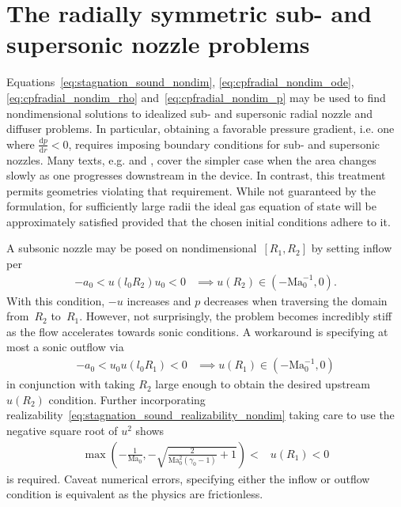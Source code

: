 \documentclass[letterpaper,11pt,nointlimits,reqno]{amsart}
\newcommand{\Mach}[1][]{\mbox{Ma}_{#1}}
\begin{document}
\section{The radially symmetric sub- and supersonic nozzle problems}

Equations~\eqref{eq:stagnation_sound_nondim}, \eqref{eq:cpfradial_nondim_ode},
\eqref{eq:cpfradial_nondim_rho} and~\eqref{eq:cpfradial_nondim_p} may be used
to find nondimensional solutions to idealized sub- and supersonic radial nozzle
and diffuser problems.  In particular, obtaining a favorable pressure gradient,
i.e. one where $\frac{\mathrm{d}p}{\mathrm{d}r} < 0$, requires imposing
boundary conditions for sub- and supersonic nozzles.  Many texts, e.g.
\citet[\textsection{}9.4]{White1999Fluid} and
\citet[\textsection{}97]{Landau2004Fluid}, cover the simpler case when the area
changes slowly as one progresses downstream in the device.  In contrast, this
treatment permits geometries violating that requirement.  While not guaranteed
by the formulation, for sufficiently large radii the ideal gas equation of
state will be approximately satisfied provided that the chosen initial
conditions adhere to it.

A subsonic nozzle may be posed on nondimensional~$\left[R_{1}, R_{2}\right]$ by
setting inflow per
\begin{align}
    -a_0 < u\!\left(l_0 R_{2}\right) u_0 < 0
    &\implies
    u\!\left(R_{2}\right) \in \left(-\Mach[0]^{-1}, 0\right)
.
\end{align}
With this condition, $-u$ increases and $p$ decreases when traversing the
domain from~$R_{2}$ to~$R_{1}$.  However, not surprisingly, the problem becomes
incredibly stiff as the flow accelerates towards sonic conditions.  A
workaround is specifying at most a sonic outflow via
\begin{align}
    -a_0 < u_0 u\!\left(l_0 R_1\right) < 0
    &\implies
    u\!\left(R_1\right) \in \left(-\Mach[0]^{-1}, 0\right)
\end{align}
in conjunction with taking $R_{2}$ large enough to obtain the desired upstream
$u\!\left(R_{2}\right)$ condition.  Further incorporating
realizability~\eqref{eq:stagnation_sound_realizability_nondim} taking care to
use the negative square root of $u^2$ shows
\begin{align}
  \max\left(
    -\frac{1}{\Mach[0]}, -\sqrt{\frac{2}{\Mach[0]^2\left(\gamma_0-1\right)}+1}
  \right) < &u\!\left(R_1\right) < 0
\label{eq:cpfradial_nozzle_subsonic_bc}
\end{align}
is required.  Caveat numerical errors, specifying either the inflow or outflow
condition is equivalent as the physics are frictionless.
\end{document}
